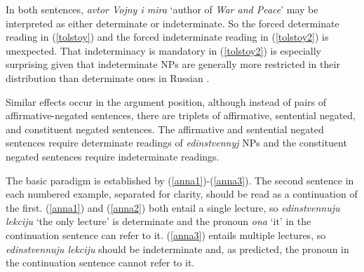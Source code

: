 In both sentences, \textit{avtor Vojny i mira} `author of \textit{War and Peace}' may be interpreted as either determinate or indeterminate. So the forced determinate reading in (\ref{tolstoy}) and the forced indeterminate reading in (\ref{tolstoy2}) is unexpected. That indeterminacy is mandatory in (\ref{tolstoy2}) is especially surprising given that indeterminate NPs are generally more restricted in their distribution than determinate ones in Russian \citep{geist2010}.

Similar effects occur in the argument position, although instead of pairs of affirmative-negated sentences, there are triplets of affirmative, sentential negated, and constituent negated sentences. The affirmative and sentential negated sentences require determinate readings of \textit{edinstvennyj} NPs and the constituent negated sentences require indeterminate readings.

The basic paradigm is established by (\ref{anna1})-(\ref{anna3}). The second sentence in each numbered example, separated for clarity, should be read as a continuation of the first. (\ref{anna1}) and (\ref{anna2}) both entail a single lecture, so \textit{edinstvennuju lekciju} `the only lecture' is determinate and the pronoun \textit{ona} `it' in the continuation sentence can refer to it. (\ref{anna3}) entails multiple lectures, so \textit{edinstvennuju lekciju} should be indeterminate and, as predicted, the pronoun in the continuation sentence cannot refer to it.


